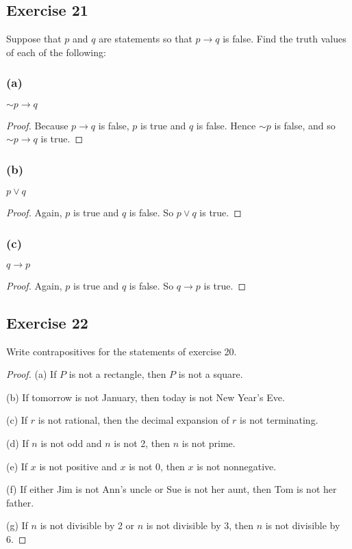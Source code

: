 \documentclass[14pt]{extarticle}
\begin{document}
\subsection{Exercise 21}
Suppose that $p$ and $q$ are statements so that $p \to q$ is false. Find the truth values of each of the following:

\subsubsection{(a)}
${\sim p} \to q$

\begin{proof}
    Because $p \to q$ is false, $p$ is true and $q$ is false. Hence ${\sim p}$ is false, and so ${\sim p} \to q$ is true. \end{proof}

\subsubsection{(b)}
$p \vee q$
\begin{proof}
    Again, $p$ is true and $q$ is false. So $p \vee q$ is true.
\end{proof}

\subsubsection{(c)}
$q \to p$

\begin{proof}
    Again, $p$ is true and $q$ is false. So $q \to p$ is true.
\end{proof}

\subsection{Exercise 22}
Write contrapositives for the statements of exercise 20.

\begin{proof}
    (a) If $P$ is not a rectangle, then $P$ is not a square.

    (b) If tomorrow is not January, then today is not New Year’s Eve.

    (c) If $r$ is not rational, then the decimal expansion of $r$ is not terminating.

    (d) If $n$ is not odd and $n$ is not 2, then $n$ is not prime.

    (e) If $x$ is not positive and $x$ is not 0, then $x$ is not nonnegative.

    (f) If either Jim is not Ann’s uncle or Sue is not her aunt, then Tom is not her father.

    (g) If $n$ is not divisible by 2 or $n$ is not divisible by 3, then $n$ is not divisible by 6.
\end{proof}
\end{document}
